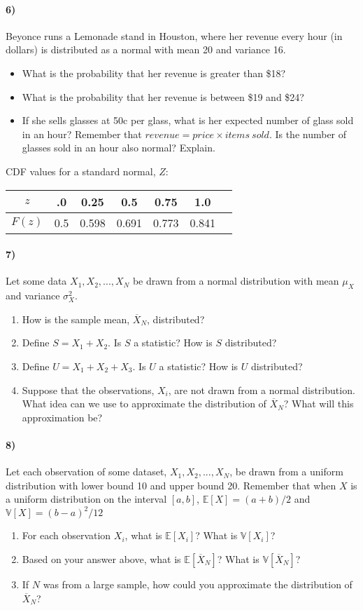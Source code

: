 \documentclass[12pt]{article}
\newcommand\ov{\overline}
\newcommand\BB{\mathbb}
\newcommand\EE{\mathbb{E}}
\numberwithin{equation}{section}
\numberwithin{figure}{section}
\numberwithin{table}{section}
\begin{document}
\paragraph{6)} Beyonce runs a Lemonade stand in Houston, where her revenue every hour (in dollars) is distributed as a normal with mean 20 and variance 16.
\begin{itemize}
\item What is the probability that her revenue is greater than \$18?
\item What is the probability that her revenue is between \$19 and \$24?
\item If she sells glasses at 50c per glass, what is her expected number of glass sold in an hour? Remember that $revenue = price\times{items\ sold}$. Is the number of glasses sold in an hour also normal? Explain.
\end{itemize}
CDF values for a standard normal, $Z$:
\begin{center}
\begin{tabular}{ccccccc}
$z$ & .0 & 0.25 & 0.5 & 0.75 & 1.0 \\ \hline
$F(z)$ &  0.5 & 0.598 & 0.691 & 0.773 & 0.841
\end{tabular}
\end{center}

\paragraph{7)} Let some data $X_1,X_2,...,X_N$ be drawn from a normal distribution with mean $\mu_{X}$ and variance $\sigma^2_{X}$.
\begin{enumerate}
\item How is the sample mean, $\ov{X}_{N}$, distributed?
\item Define $S = X_1+X_2$. Is $S$ a statistic? How is $S$ distributed?
\item Define $U = X_1+X_2+X_3$. Is $U$ a statistic? How is $U$ distributed?
\item Suppose that the observations, $X_i$, are not drawn from a normal distribution. What idea can we use to approximate the distribution of $\ov{X}_N$? What will this approximation be?
\end{enumerate}

\paragraph{8)} Let each observation of some dataset, $X_1,X_2,...,X_N$, be drawn from a uniform distribution with lower bound 10 and upper bound 20. Remember that when $X$ is a uniform distribution on the interval $[a,b]$, $\EE[X] = (a+b)/2$ and $\BB{V}[X] = (b-a)^2/12$
\begin{enumerate}
\item For each observation $X_i$, what is $\EE[X_i]$? What is $\BB{V}[X_i]$?
\item Based on your answer above, what is $\EE[\ov{X}_N]$? What is $\BB{V}[\ov{X}_N]$?
\item If $N$ was from a large sample, how could you approximate the distribution of $\ov{X}_N$?
\end{enumerate}
\end{document}
